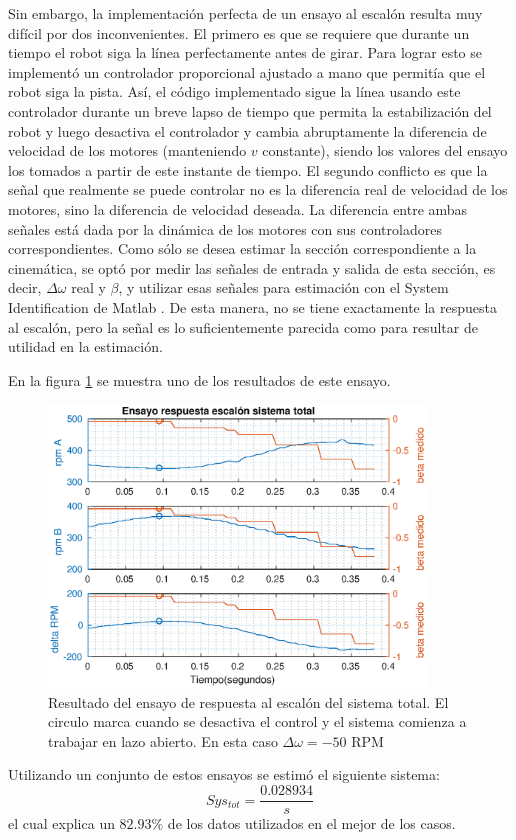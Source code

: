 \documentclass[10pt,conference,a4paper,onecolumn]{article}%
\begin{document}
Sin embargo, la implementación perfecta de un ensayo al escalón resulta muy difícil por dos inconvenientes. El primero es que se requiere que durante un tiempo el robot siga la línea perfectamente antes de girar. Para lograr esto se implementó un controlador proporcional ajustado a mano que permitía que el robot siga la pista. Así, el código implementado sigue la línea usando este controlador durante un breve lapso de tiempo que permita la estabilización del robot y luego desactiva el controlador y cambia abruptamente la diferencia de velocidad de los motores (manteniendo $v$ constante), siendo los valores del ensayo los tomados a partir de este instante de tiempo.
El segundo conflicto es que la señal que realmente se puede controlar no es la diferencia real de velocidad de los motores, sino la diferencia de velocidad deseada. La diferencia entre ambas señales está dada por la dinámica de los motores con sus controladores correspondientes. Como sólo se desea estimar la sección correspondiente a la cinemática, se optó por medir las señales de entrada y salida de esta sección, es decir, $\Delta \omega$ real y $\beta$, y utilizar esas señales para estimación con el System Identification de Matlab \cite{Sys_ident} . {\color{red}De esta manera, no se tiene exactamente la respuesta al escalón, pero la señal es lo suficientemente parecida como para resultar de utilidad en la estimación.}

En la figura \ref{fig:ensayoSistTotal} se muestra uno de los resultados de este ensayo.
\begin{figure}
\centering
\includegraphics[width=10cm]{./imagenes/resp_escalon_sys_total}
\caption{Resultado del ensayo de respuesta al escalón del sistema total. El circulo marca cuando se desactiva el control y el sistema comienza a trabajar en lazo abierto. En esta caso $\Delta \omega=-50 $ RPM}
\label{fig:ensayoSistTotal}
\end{figure}
Utilizando un conjunto de estos ensayos se estimó el siguiente sistema:
\begin{equation}
Sys_{tot}= \frac{0.028934}{s}  
\label{eq:sys_tot_est}
\end{equation}
el cual explica un $82.93\%$ de los datos utilizados en el mejor de los casos.
\end{document}
